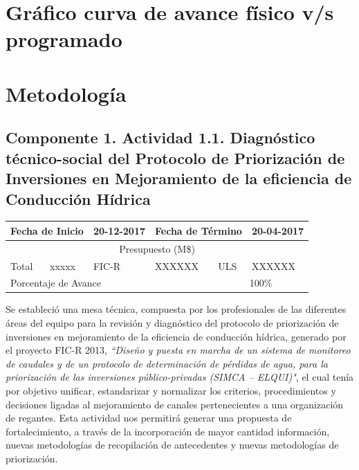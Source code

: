 \documentclass[]{article}
\begin{document}
\clearpage
\section{Gráfico curva de avance físico v/s programado}

\clearpage
\section{Metodología}

\subsection{Componente 1. Actividad 1.1. Diagnóstico técnico-social del Protocolo de Priorización de Inversiones en Mejoramiento de la eficiencia de Conducción Hídrica}

\begin{table}[!htb]
\centering
\begin{tabular}{|p{2cm}|p{2cm}|p{2cm}|p{2cm}|p{2cm}|p{2cm}|}
    \hline
    \multicolumn{2}{|l|}{Fecha de Inicio} & 20-12-2017 & \multicolumn{2}{l|}{Fecha de Término} & 20-04-2017\\
    \hline
    \multicolumn{6}{|c|}{Presupuesto (M\$)}\\
    \hline
    Total & xxxxx & FIC-R & XXXXXX & ULS & XXXXXX\\
    \hline
    \multicolumn{4}{|l|}{Porcentaje de Avance} & \multicolumn{2}{c|}{100\%}\\
    \hline
\end{tabular}
\end{table}

Se estableció una mesa técnica, compuesta por los profesionales de las diferentes áreas del equipo para la revisión y diagnóstico del protocolo de priorización de inversiones en mejoramiento de la eficiencia de conducción hídrica, generado por el proyecto FIC-R 2013, \textit{``Diseño y puesta en marcha de un sistema de monitoreo de caudales y de un protocolo de determinación de pérdidas de agua, para la priorización de las inversiones público-privadas (SIMCA – ELQUI)"}, el cual tenía por objetivo unificar, estandarizar y normalizar los criterios, procedimientos y decisiones ligadas al mejoramiento de canales pertenecientes a una organización de regantes. Esta actividad nos permitirá generar una propuesta de fortalecimiento, a través de la incorporación de mayor cantidad información, nuevas metodologías de recopilación de antecedentes y nuevas metodologías de priorización.
\end{document}
